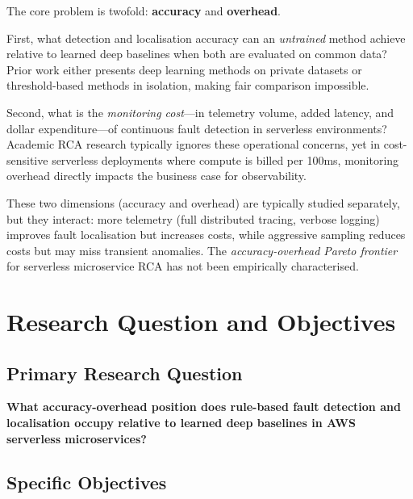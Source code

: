 The core problem is twofold: \textbf{accuracy} and \textbf{overhead}. 

First, what detection and localisation accuracy can an \textit{untrained} method achieve relative to learned deep baselines when both are evaluated on common data? Prior work either presents deep learning methods on private datasets or threshold-based methods in isolation, making fair comparison impossible. 

Second, what is the \textit{monitoring cost}—in telemetry volume, added latency, and dollar expenditure—of continuous fault detection in serverless environments? Academic RCA research typically ignores these operational concerns, yet in cost-sensitive serverless deployments where compute is billed per 100ms, monitoring overhead directly impacts the business case for observability.

These two dimensions (accuracy and overhead) are typically studied separately, but they interact: more telemetry (full distributed tracing, verbose logging) improves fault localisation but increases costs, while aggressive sampling reduces costs but may miss transient anomalies. The \textit{accuracy-overhead Pareto frontier} for serverless microservice RCA has not been empirically characterised.

\section{Research Question and Objectives}

\subsection{Primary Research Question}

\textbf{What accuracy-overhead position does rule-based fault detection and localisation occupy relative to learned deep baselines in AWS serverless microservices?}

\subsection{Specific Objectives}


